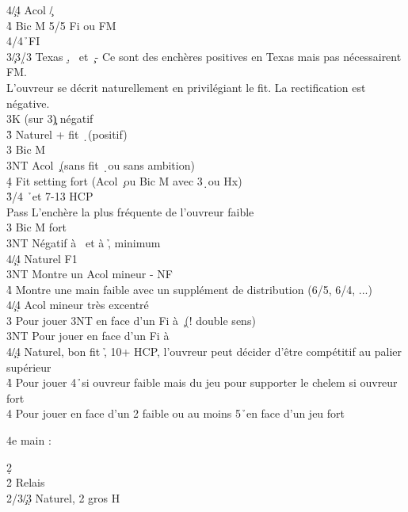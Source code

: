 \documentclass[a4paper]{article}
\begin{document}
\begin{bidtable}
4\c/4\d \> Acol \c /\d \\
4\h \> Bic M 5/5 Fi ou FM\\
4\s {}\s /4\h\ FI\-\\
3\c/3\d/3\s \> Texas \d , \s\ et \c\ - Ce sont des enchères positives en Texas mais pas nécessairent FM.\\
\>L'ouvreur se décrit naturellement en privilégiant le fit. La rectification est négative.\+\\
3K \> (sur 3\c ) négatif\\
3\h \> Naturel + fit \d\ (positif)\\
3\s \> Bic M\\
3NT \> Acol \c\ (sans fit \d\ ou sans ambition)\\
4\d \> Fit setting fort (Acol \c\ ou Bic M avec 3\d\ ou Hx)\-\\
3\h {}/4 \h\ et 7-13 HCP\+\\
Pass \> L'enchère la plus fréquente de l'ouvreur faible\\
3\s \> Bic M fort\+\\
3NT \> Négatif à \s\ et à \h , minimum\\
4\c/4\d \> Naturel F1\-\\
3NT \> Montre un Acol mineur - NF\\
4\h \> Montre une main faible avec un supplément de distribution (6/5, 6/4, ...)\\
4\c/4\d \> Acol mineur très excentré\-\\
3\s \> Pour jouer 3NT en face d'un Fi à \c\ (! double sens)\\
3NT \> Pour jouer en face d'un Fi à \d \\
4\c/4\d \> Naturel, bon fit \h , 10+ HCP, l'ouvreur peut décider d'être compétitif au palier supérieur\\
4\h \> Pour jouer 4\h\ si ouvreur faible mais du jeu pour supporter le chelem si ouvreur fort\\
4\s \> Pour jouer en face d'un 2 faible ou au moins 5\h\ en face d'un jeu fort\-
\end{bidtable}

\begin{bidtable}
4e \> main :
\end{bidtable}

\begin{bidtable}
2\d\+\\
2\h \> Relais\\
2\s/3\c/3\d \> Naturel, 2 gros H\-
\end{bidtable}
\end{document}
